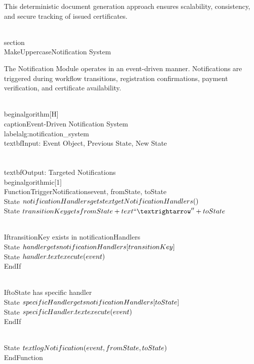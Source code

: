 This deterministic document generation approach ensures scalability, consistency, and secure tracking of issued certificates.

\\section{\\MakeUppercase{Notification System}}

The Notification Module operates in an event-driven manner. Notifications are triggered during workflow transitions, registration confirmations, payment verification, and certificate availability.

\\begin{algorithm}[H]
\\caption{Event-Driven Notification System}
\\label{alg:notification_system}
\\textbf{Input:} Event Object, Previous State, New State\\\\
\\textbf{Output:} Targeted Notifications
\\begin{algorithmic}[1]
\\Function{TriggerNotifications}{event, fromState, toState}
    \\State $notificationHandlers \\gets \\text{getNotificationHandlers}()$
    \\State $transitionKey \\gets fromState + \\text{`` → ''} + toState$
    
    \\If{transitionKey exists in notificationHandlers}
        \\State $handler \\gets notificationHandlers[transitionKey]$
        \\State $handler.\\text{execute}(event)$
    \\EndIf
    
    \\If{toState has specific handler}
        \\State $specificHandler \\gets notificationHandlers[toState]$
        \\State $specificHandler.\\text{execute}(event)$
    \\EndIf
    
    \\State $\\text{logNotification}(event, fromState, toState)$
\\EndFunction

